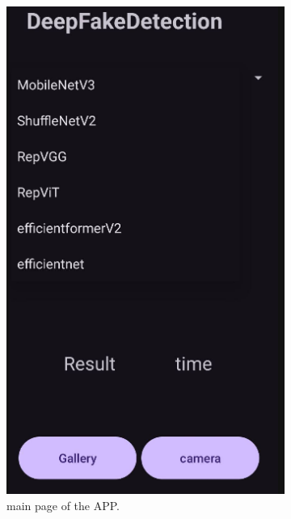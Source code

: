\documentclass[10pt,twocolumn,letterpaper]{article}
\begin{document}
\begin{figure}
  \centering
  \begin{subfigure}{0.45\linewidth}
    \centering
    \includegraphics[width=0.75\linewidth]{figure/app_0.png}
    \caption{main page of the APP.}
    \label{fig:f2}
  \end{subfigure}
  \hfill
  \begin{subfigure}{0.45\linewidth}
    \centering

\end{subfigure}
\end{figure}
\end{document}
